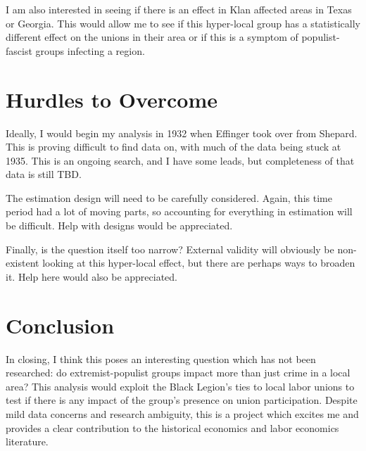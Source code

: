 \documentclass[11pt]{article}
\theoremstyle{definition}
\theoremstyle{remark}
\begin{document}
I am also interested in seeing if there is an effect in Klan affected areas in Texas or Georgia. This would allow me to see if this hyper-local group has a statistically different effect on the unions in their area or if this is a symptom of populist-fascist groups infecting a region.

\section{Hurdles to Overcome}

Ideally, I would begin my analysis in 1932 when Effinger took over from Shepard. This is proving difficult to find data on, with much of the data being stuck at 1935. This is an ongoing search, and I have some leads, but completeness of that data is still TBD. 

The estimation design will need to be carefully considered. Again, this time period had a lot of moving parts, so accounting for everything in estimation will be difficult. Help with designs would be appreciated. 

Finally, is the question itself too narrow? External validity will obviously be non-existent looking at this hyper-local effect, but there are perhaps ways to broaden it. Help here would also be appreciated.

\section{Conclusion}

In closing, I think this poses an interesting question which has not been researched: do extremist-populist groups impact more than just crime in a local area? This analysis would exploit the Black Legion's ties to local labor unions to test if there is any impact of the group's presence on union participation. Despite mild data concerns and research ambiguity, this is a project which excites me and provides a clear contribution to the historical economics and labor economics literature.
\end{document}
